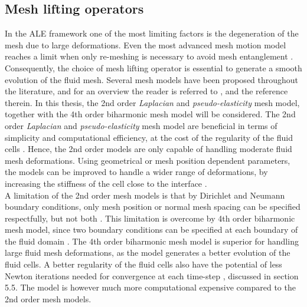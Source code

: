 \subsection{Mesh lifting operators}
In the ALE framework one of the most limiting factors is the degeneration of the mesh due to large deformations. Even the most advanced mesh motion model reaches a limit when only re-meshing is necessary to avoid mesh entanglement \cite{Wall12006}. Consequently, the choice of mesh lifting operator is essential to generate a smooth evolution of the fluid mesh. Several mesh models have been proposed throughout the literature, and for an overview the reader is referred to \cite{MM2016}, and the reference therein. 
In this thesis, the 2nd order \textit{Laplacian} and \textit{pseudo-elasticity} mesh model, together with the 4th order biharmonic mesh model will be considered. The 2nd order \textit{Laplacian} and \textit{pseudo-elasticity} mesh model are beneficial in terms of simplicity and computational efficiency, at the cost of the regularity of the fluid cells \cite{Wick2011}. Hence, the 2nd order models are only capable of handling moderate fluid mesh deformations. Using geometrical or mesh position dependent parameters, the models can be improved to handle a wider range of deformations, by increasing the stiffness of the cell close to the interface \cite{Hsu}. \\

A limitation of the 2nd order mesh models is that by Dirichlet and Neumann boundary conditions, only mesh position or normal mesh spacing can be specified respectfully, but not both \cite{Helenbrook2003}. This limitation is overcome by 4th order biharmonic mesh model, since two boundary conditions can be specified at each boundary of the fluid domain \cite{Helenbrook2003}. The 4th order biharmonic mesh model is superior for handling large fluid mesh deformations, as the model generates a better evolution of the fluid cells. A better regularity of the fluid cells also have the potential of less Newton iterations needed for convergence at each time-step \cite{Wick2011}, discussed in section 5.5. The model is however much more computational expensive compared to the 2nd order mesh models. 

